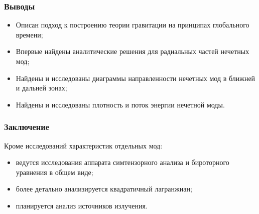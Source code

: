 \documentclass[compress]{beamer}
\begin{document}

    \begin{frame}\frametitle{Выводы}

        \begin{itemize}
            \item Описан подход к построению теории гравитации на принципах глобального времени;
            \item Впервые найдены аналитические решения для радиальных частей нечетных мод;
            \item Найдены и исследованы диаграммы направленности нечетных мод в ближней и дальней зонах;
            \item Найдены и исследованы плотность и поток энергии нечетной моды.
        \end{itemize}

    \end{frame}


    \begin{frame}\frametitle{Заключение}

        Кроме исследований характеристик отдельных мод:
        \begin{itemize}
            \item ведутся исследования аппарата симтензорного анализа и бироторного уравнения в общем виде;
            \item более детально анализируется квадратичный лагранжиан;
            \item планируется анализ источников излучения.
        \end{itemize}

    \end{frame}
\end{document}
